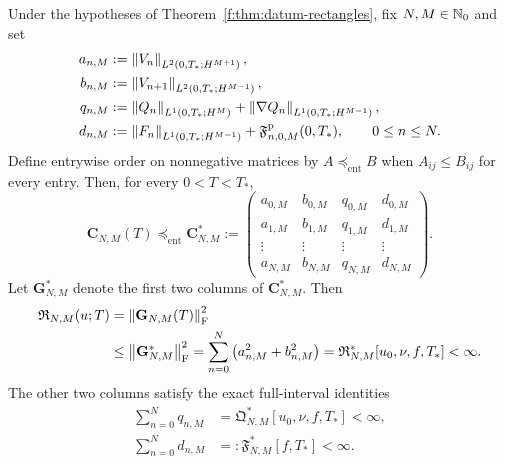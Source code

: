 \begin{proposition}
\label{f:prop:datum-terminal-matrix-consequence}
Under the hypotheses of Theorem~\ref{f:thm:datum-rectangles}, fix
\(N,M\in\mathbb N_0\) and set
\begin{align}
 a_{n,M}
 &:=\left\lVert V_n\right\rVert_{L^2(0,T_*;H^{M+1})},\notag\\
 b_{n,M}
 &:=\left\lVert V_{n+1}\right\rVert_{L^2(0,T_*;H^{M-1})},\notag\\
 q_{n,M}
 &:=\left\lVert Q_n\right\rVert_{L^1(0,T_*;H^M)}
   +\left\lVert \nabla Q_n\right\rVert_{L^1(0,T_*;H^{M-1})},\notag\\
 d_{n,M}
 &:=\left\lVert F_n\right\rVert_{L^1(0,T_*;H^{M-1})}
   +\mathfrak F^{\rm p}_{n,0,M}(0,T_*),
 \qquad 0\le n\le N.
 \label{f:eq:datum-terminal-coordinate-norms}
\end{align}
Define entrywise order on nonnegative matrices by
\(A\preceq_{\mathrm{ent}}B\) when \(A_{ij}\le B_{ij}\) for every entry.
Then, for every \(0<T<T_*\),
\begin{equation}
 \mathbf C_{N,M}(T)
 \preceq_{\mathrm{ent}}
 \mathbf C_{N,M}^*
 :=
 \begin{pmatrix}
  a_{0,M}&b_{0,M}&q_{0,M}&d_{0,M}\\
  a_{1,M}&b_{1,M}&q_{1,M}&d_{1,M}\\
  \vdots&\vdots&\vdots&\vdots\\
  a_{N,M}&b_{N,M}&q_{N,M}&d_{N,M}
 \end{pmatrix}.
 \label{f:eq:datum-terminal-matrix-bound}
\end{equation}
Let \(\mathbf G_{N,M}^*\) denote the first two columns of
\(\mathbf C_{N,M}^*\).  Then
\begin{align}
 \mathfrak R_{N,M}(u;T)
 &=\left\lVert \mathbf G_{N,M}(T)\right\rVert_{\mathrm F}^2\notag\\
 &\le\left\lVert \mathbf G_{N,M}^*\right\rVert_{\mathrm F}^2
 =\sum_{n=0}^{N}\left(a_{n,M}^2+b_{n,M}^2\right)
 =\mathfrak R_{N,M}^*[u_0,\nu,f,T_*]<\infty.
 \label{f:eq:datum-terminal-finite-sum}
\end{align}
The other two columns satisfy the exact full-interval identities
\begin{align}
 \sum_{n=0}^Nq_{n,M}
 &=\mathfrak Q_{N,M}^*[u_0,\nu,f,T_*]<\infty,
 \label{f:eq:datum-terminal-pressure-column}\\
 \sum_{n=0}^Nd_{n,M}
 &=:\mathfrak F_{N,M}^*[f,T_*]<\infty.
 \label{f:eq:datum-terminal-force-column}
\end{align}
\end{proposition}

